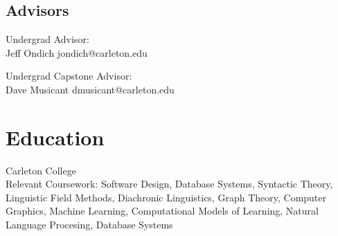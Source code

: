 \documentclass{cv}
\begin{document}
\begin{paracol}{2}
\begin{raggedright}
\subsection{Advisors}
\begin{closeitems}
\item Undergrad Advisor: \\Jeff Ondich
jondich@carleton.edu
\item Undergrad Capstone Advisor:\\
Dave Musicant dmusicant@carleton.edu
\end{closeitems}
\end{raggedright}
\switchcolumn
\section{Education}
Carleton College\\
Relevant Coursework: Software Design, Database Systems, Syntactic Theory, Linguistic Field Methods, Diachronic Linguistics, Graph Theory, Computer Graphics, Machine Learning, Computational Models of Learning, Natural Language Procesing, Database Systems

\end{paracol}
\end{document}
